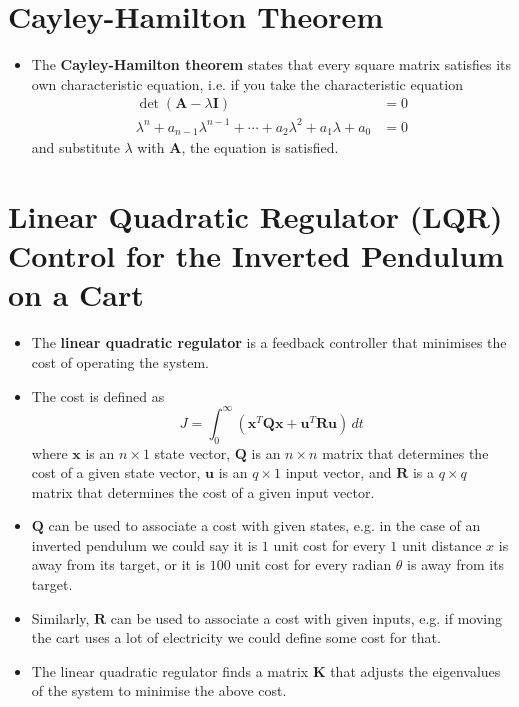 \documentclass{article}
\renewcommand{\vec}[1]{\boldsymbol{\mathbf{#1}}}
\begin{document}
\setcounter{section}{9}
\section{Cayley-Hamilton Theorem}

\begin{itemize}
  \item The \textbf{Cayley-Hamilton theorem} states that every square matrix satisfies its own characteristic equation, i.e. if you take the characteristic equation \begin{align*}
          \det (\vec{A} - \lambda \vec{I})                                                   & = 0 \\
          \lambda^n + a_{n - 1} \lambda^{n - 1} + \cdots + a_2 \lambda^2 + a_1 \lambda + a_0 & = 0
        \end{align*} and substitute $\lambda$ with $\vec{A}$, the equation is satisfied.
\end{itemize}

\setcounter{section}{13}
\section{Linear Quadratic Regulator (LQR) Control for the Inverted Pendulum on a Cart}

\begin{itemize}
  \item The \textbf{linear quadratic regulator} is a feedback controller that minimises the cost of operating the system.

  \item The cost is defined as \[J = \int_0^\infty (\vec{x}^T \vec{Q} \vec{x} + \vec{u}^T \vec{R} \vec{u}) \,dt\] where $\vec{x}$ is an $n \times 1$ state vector, $\vec{Q}$ is an $n \times n$ matrix that determines the cost of a given state vector, $\vec{u}$ is an $q \times 1$ input vector, and $\vec{R}$ is a $q \times q$ matrix that determines the cost of a given input vector.

  \item $\vec{Q}$ can be used to associate a cost with given states, e.g. in the case of an inverted pendulum we could say it is $1$ unit cost for every $1$ unit distance $x$ is away from its target, or it is $100$ unit cost for every radian $\theta$ is away from its target.

  \item Similarly, $\vec{R}$ can be used to associate a cost with given inputs, e.g. if moving the cart uses a lot of electricity we could define some cost for that.

  \item The linear quadratic regulator finds a matrix $\vec{K}$ that adjusts the eigenvalues of the system to minimise the above cost.
\end{itemize}
\end{document}
